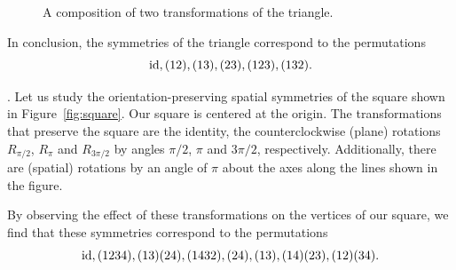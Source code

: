 \begin{example}
\begin{figure}
\caption{A composition of two transformations 
of the triangle.}
\label{fig:composition}
\end{figure}

In conclusion,  
the symmetries of the triangle 
correspond to the permutations
\[
\operatorname{id}, (12), (13), (23), (123), (132).
\]
\end{example}

\begin{example}
.
Let us study the 
orientation-preserving spatial symmetries of the square shown in Figure~\ref{fig:square}. Our square is centered at the origin. The transformations that preserve the square are the identity, the counterclockwise (plane) rotations
$R_{\pi/2}$, $R_{\pi}$ and $R_{3\pi/2}$ by angles 
$\pi/2$, $\pi$ and $3\pi/2$, respectively. Additionally, there are (spatial) rotations by an angle of $\pi$ about the axes along the lines shown in the figure. 
    
By observing the effect of these transformations on the vertices of our square, we find that these symmetries correspond to the permutations
\[
\operatorname{id}, (1234), (13)(24), (1432), (24), (13), (14)(23), (12)(34).
\]
\end{example}

